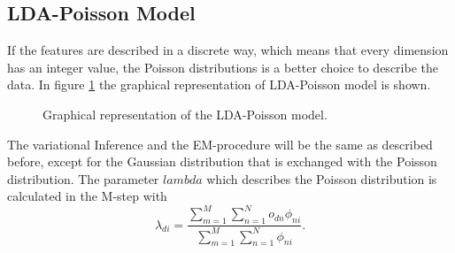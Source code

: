 \documentclass[11pt,a4paper]{article}
\begin{document}
\subsection{LDA-Poisson Model}


If the features are described in a discrete way, which means that every dimension has an integer value, the Poisson distributions is a better choice to describe the data. In figure \ref{fig:LDAPoisson} the graphical representation of LDA-Poisson model is shown. 

\begin{figure}[h!]
\centering
\def\svgwidth{0.8\textwidth}

\caption{Graphical representation of the LDA-Poisson model.}
\label{fig:LDAPoisson}
\end{figure}

The variational Inference and the EM-procedure will be the same as described before, except for the Gaussian distribution that is exchanged with the Poisson distribution. The parameter $lambda$ which describes the Poisson distribution is calculated in the M-step with
\begin{equation}
 \lambda_{di} = \frac{\sum_{m=1}^M \sum_{n=1}^N o_{dn} \phi_{ni} }{\sum_{m=1}^M \sum_{n=1}^N  \phi_{ni}}.
\end{equation}
\end{document}
